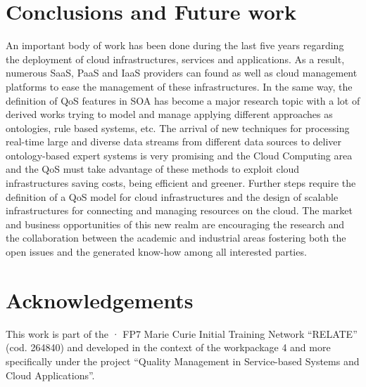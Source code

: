 \documentclass[preprint,12pt]{elsarticle}
\begin{document}
\section{Conclusions and Future work}\label{sect:conclusions}
An important body of work has been done during the last five years regarding the deployment of cloud infrastructures, services and applications. As a result, numerous SaaS, PaaS and IaaS providers can found as well as cloud management platforms to ease the management of these infrastructures. In the same way, the definition of QoS features in SOA has become a major research topic with a lot of derived works trying to model and manage applying different approaches as ontologies, rule based systems, etc. The arrival of new techniques for processing real-time large and diverse data streams from different data sources to deliver ontology-based expert systems is very promising and the Cloud Computing area and the QoS must take advantage of these methods to exploit cloud infrastructures saving costs, being efficient and greener. Further steps require the definition of a QoS model for cloud infrastructures and the design of scalable infrastructures for connecting and managing resources on the cloud. The market and 
business opportunities of this new realm are encouraging the research and the collaboration between the academic and industrial areas fostering both the open issues and the generated know-how among all interested parties.
\section{Acknowledgements}\label{sect:ack}
This work is part of the · FP7 Marie Curie Initial Training Network ``RELATE'' (cod. 264840) and developed in the context of the workpackage 4 and more 
specifically under the project ``Quality Management in Service-based Systems and Cloud Applications''.



% 


\end{document}
